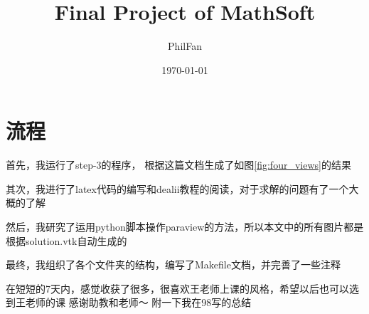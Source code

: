 \documentclass[12pt, a4paper]{article}
\title{Final Project of MathSoft}
\author{PhilFan}
\date{\today}
\numberwithin{equation}{section} %
\begin{document}
\maketitle
\setcounter{page}{0}
\maketitle
\thispagestyle{empty}


\newpage
{}
\setcounter{page}{1}
\tableofcontents

\newpage
\setcounter{page}{1}
\pagestyle{sectionheader} %


\section{流程}
首先，我运行了step-3的程序，
根据这篇文档\cite{refa}生成了如图\ref{fig:four_views}的结果

其次，我进行了latex代码的编写和dealii教程的阅读，对于求解的问题有了一个大概的了解

然后，我研究了运用python脚本操作paraview的方法，所以本文中的所有图片都是根据solution.vtk自动生成的

最终，我组织了各个文件夹的结构，编写了Makefile文档，并完善了一些注释

在短短的7天内，感觉收获了很多，很喜欢王老师上课的风格，希望以后也可以选到王老师的课
感谢助教和老师～
附一下我在98写的总结\cite{ref1}
\end{document}
